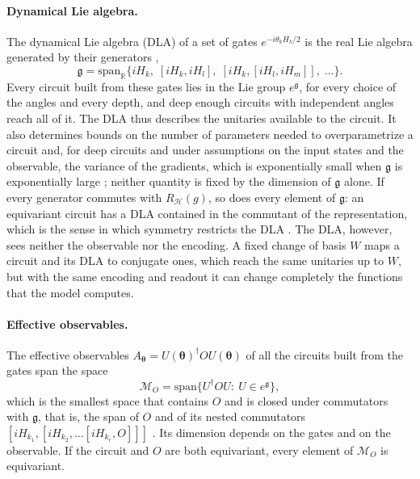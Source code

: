 \documentclass[aps,pra,reprint,superscriptaddress,longbibliography]{revtex4-2}
\newcommand{\Hi}{\mathcal{H}}
\newcommand{\RH}{R_{\Hi}}
\begin{document}
\paragraph{Dynamical Lie algebra.} The dynamical Lie algebra (DLA) of a set of gates $e^{-i\theta_kH_k/2}$ is the real Lie algebra generated by their generators \citep{larocca2023theory,ragone2024lie},
\begin{equation}
\mathfrak g=\mathrm{span}_{\mathbb R}\bigl\{iH_k,\;[iH_k,iH_l],\;[iH_k,[iH_l,iH_m]],\;\ldots\bigr\}.
\label{eq:dla}
\end{equation}
Every circuit built from these gates lies in the Lie group $e^{\mathfrak g}$, for every choice of the angles and every depth, and deep enough circuits with independent angles reach all of it. The DLA thus describes the unitaries available to the circuit. It also determines bounds on the number of parameters needed to overparametrize a circuit \citep{larocca2023theory} and, for deep circuits and under assumptions on the input states and the observable, the variance of the gradients, which is exponentially small when $\mathfrak g$ is exponentially large \citep{ragone2024lie,fontana2024characterizing}; neither quantity is fixed by the dimension of $\mathfrak g$ alone. If every generator commutes with $\RH(g)$, so does every element of $\mathfrak g$: an equivariant circuit has a DLA contained in the commutant of the representation, which is the sense in which symmetry restricts the DLA \citep{larocca2022group}. The DLA, however, sees neither the observable nor the encoding. A fixed change of basis $W$ maps a circuit and its DLA to conjugate ones, which reach the same unitaries up to $W$, but with the same encoding and readout it can change completely the functions that the model computes.

\paragraph{Effective observables.} The effective observables $A_{\boldsymbol\theta}=U(\boldsymbol\theta)^\dagger OU(\boldsymbol\theta)$ of all the circuits built from the gates span the space
\begin{equation}
\mathcal M_O=\mathrm{span}\{U^\dagger OU:\ U\in e^{\mathfrak g}\},
\label{eq:module}
\end{equation}
which is the smallest space that contains $O$ and is closed under commutators with $\mathfrak g$, that is, the span of $O$ and of its nested commutators $[iH_{k_1},[iH_{k_2},\ldots[iH_{k_r},O]]]$ \citep{ragone2024lie,diaz2023showcasing}. Its dimension depends on the gates and on the observable. If the circuit and $O$ are both equivariant, every element of $\mathcal M_O$ is equivariant.
\end{document}
